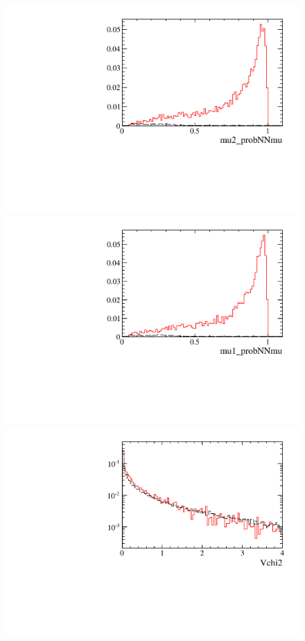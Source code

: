 \documentclass[12pt,a4paper]{article}
\begin{document}
\begin{figure} [htb!]
\begin{center}
\includegraphics[scale=0.20]{figs/mu2_probNNmuPARTIALptcut.pdf}
\includegraphics[scale=0.20]{figs/mu1_probNNmuPARTIALptcut.pdf}
\includegraphics[scale=0.20]{figs/Vchi2PARTIALptcut.pdf}

\end{center}
\end{figure}
\end{document}
